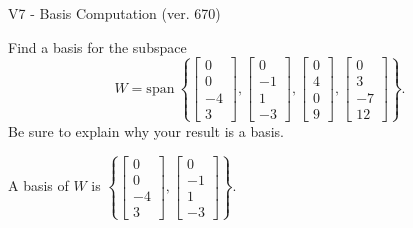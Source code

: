 \begin{exercise}
  \begin{exerciseTitle}V7 - Basis Computation (ver. 670)\end{exerciseTitle}
  \begin{exerciseStatement}
    Find a basis for the subspace 
\[W=\mathrm{span}\ \left\{\left[\begin{array}{r}
0 \\
0 \\
-4 \\
3
\end{array}\right] , \left[\begin{array}{r}
0 \\
-1 \\
1 \\
-3
\end{array}\right] , \left[\begin{array}{r}
0 \\
4 \\
0 \\
9
\end{array}\right] , \left[\begin{array}{r}
0 \\
3 \\
-7 \\
12
\end{array}\right]\right\}.\]
 Be sure to explain why your result is a basis.


  \end{exerciseStatement}
  \begin{exerciseAnswer}
   A basis of \(W\) is  \(\left\{\left[\begin{array}{r}
0 \\
0 \\
-4 \\
3
\end{array}\right] , \left[\begin{array}{r}
0 \\
-1 \\
1 \\
-3
\end{array}\right]\right\}\).
  


  \end{exerciseAnswer}
\end{exercise}